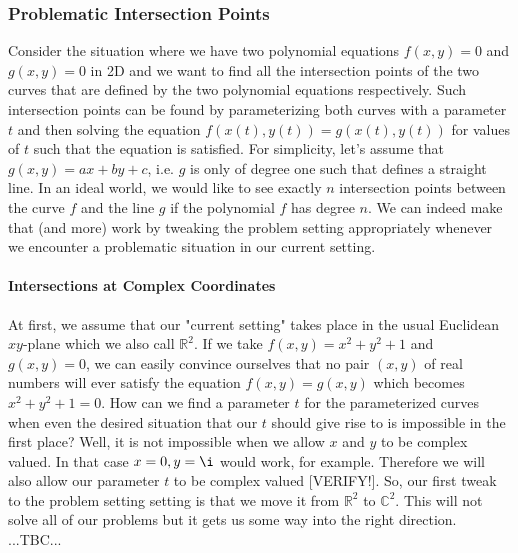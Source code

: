 





\subsubsection{Problematic Intersection Points}
Consider the situation where we have two polynomial equations $f(x,y) = 0$ and $g(x,y) = 0$ in 2D and we want to find all the intersection points of the two curves that are defined by the two polynomial equations respectively. Such intersection points can be found by parameterizing both curves with a parameter $t$ and then solving the equation $f(x(t),y(t)) = g(x(t),y(t))$ for values of $t$ such that the equation is satisfied. For simplicity, let's assume that $g(x,y) = ax + by + c$, i.e. $g$ is only of degree one such that defines a straight line. In an ideal world, we would like to see exactly $n$ intersection points between the curve $f$ and the line $g$ if the polynomial $f$ has degree $n$. We can indeed make that (and more) work by tweaking the problem setting appropriately whenever we encounter a problematic situation in our current setting.


\paragraph{Intersections at Complex Coordinates}
At first, we assume that our "current setting" takes place in the usual Euclidean $xy$-plane which we also call $\mathbb{R}^2$. If we take $f(x,y) = x^2 + y^2 + 1$ and $g(x,y) = 0$, we can easily convince ourselves that no pair $(x,y)$ of real numbers will ever satisfy the equation $f(x,y) = g(x,y)$ which becomes $x^2 + y^2 + 1 = 0$. How can we find a parameter $t$ for the parameterized curves when even the desired situation that our $t$ should give rise to is impossible in the first place? Well, it is not impossible when we allow $x$ and $y$ to be complex valued. In that case $x = 0, y = \i$ would work, for example. Therefore we will also allow our parameter $t$ to be complex valued [VERIFY!]. So, our first tweak to the problem setting setting is that we move it from $\mathbb{R}^2$ to $\mathbb{C}^2$. This will not solve all of our problems but it gets us some way into the right direction. ...TBC...


